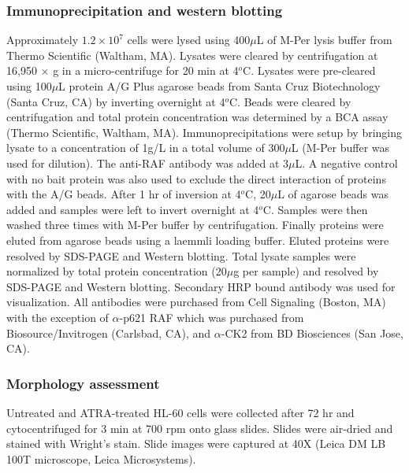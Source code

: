 \documentclass[10pt,twocolumn,twoside,final]{IEEEtran}
\begin{document}
\subsubsection*{Immunoprecipitation and western blotting}
Approximately $1.2 \times 10^7$ cells were lysed using 400$\mu$L of M-Per lysis buffer from Thermo Scientific (Waltham, MA).
Lysates were cleared by centrifugation at 16,950 $\times$ g in a micro-centrifuge for 20 min at 4$^{o}$C.
Lysates were pre-cleared using 100$\mu$L protein A/G Plus agarose beads from Santa Cruz Biotechnology (Santa Cruz, CA) by
inverting overnight at 4$^{o}$C.  Beads were cleared by centrifugation and total protein concentration
was determined by a BCA assay (Thermo Scientific, Waltham, MA).  Immunoprecipitations were setup by bringing
lysate to a concentration of 1g/L in a total volume of 300$\mu$L (M-Per buffer was used for dilution).
The anti-RAF antibody was added at 3$\mu$L.
A negative control with no bait protein was also used to exclude the direct interaction of proteins with the A/G beads.
After 1 hr of inversion at 4$^{o}$C, 20$\mu$L of agarose beads was added and samples were left
to invert overnight at 4$^{o}$C. Samples were then washed three times with M-Per buffer by centrifugation.
Finally proteins were eluted from agarose beads using a laemmli loading buffer.
Eluted proteins were resolved by SDS-PAGE and Western blotting.  Total
lysate samples were normalized by total protein concentration (20$\mu$g per sample)
and resolved by SDS-PAGE and Western blotting.  Secondary HRP bound antibody was used for visualization.
All antibodies were purchased from Cell Signaling (Boston, MA) with the exception of $\alpha$-p621 RAF which was purchased from Biosource/Invitrogen (Carlsbad, CA),
and $\alpha$-CK2 from BD Biosciences (San Jose, CA).

\subsubsection*{Morphology assessment}
Untreated and ATRA-treated HL-60 cells were collected after 72 hr and cytocentrifuged for 3 min at 700 rpm onto glass slides.
Slides were air-dried and stained with Wright’s stain. Slide images were captured at 40X (Leica DM LB 100T microscope, Leica Microsystems).


\end{document}
